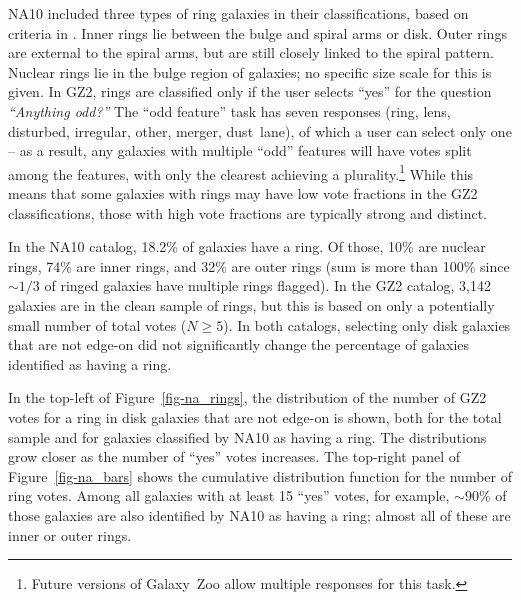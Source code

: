 \documentclass[useAMS,usenatbib]{mn2e}
\begin{document}
NA10 included three types of ring galaxies in their classifications, based on criteria in \citet{but96}. Inner rings lie between the bulge and spiral arms or disk. Outer rings are external to the spiral arms, but are still closely linked to the spiral pattern. Nuclear rings lie in the bulge region of galaxies; no specific size scale for this is given. In GZ2, rings are classified only if the user selects ``yes'' for the question {\it ``Anything odd?''} The ``odd feature'' task has seven responses (ring, lens, disturbed, irregular, other, merger, dust~lane), of which a user can select only one -- as a result, any galaxies with multiple ``odd'' features will have votes split among the features, with only the clearest achieving a plurality.\footnote{Future versions of Galaxy~Zoo allow multiple responses for this task.} While this means that some galaxies with rings may have low vote fractions in the GZ2 classifications, those with high vote fractions are typically strong and distinct.

In the NA10 catalog, 18.2\% of galaxies have a ring. Of those, 10\% are nuclear rings, 74\% are inner rings, and 32\% are outer rings (sum is more than 100\% since $\sim1/3$ of ringed galaxies have multiple rings flagged). In the GZ2 catalog, 3,142 galaxies are in the clean sample of rings, but this is based on only a potentially small number of total votes ($N\geq5$). In both catalogs, selecting only disk galaxies that are not edge-on did not significantly change the percentage of galaxies identified as having a ring. 

In the top-left of Figure~\ref{fig-na_rings}, the distribution of the number of GZ2 votes for a ring in disk galaxies that are not edge-on is shown, both for the total sample and for galaxies classified by NA10 as having a ring. The distributions grow closer as the number of ``yes'' votes increases. The top-right panel of Figure~\ref{fig-na_bars} shows the cumulative distribution function for the number of ring votes. Among all galaxies with at least 15 ``yes'' votes, for example, $\sim90\%$ of those galaxies are also identified by NA10 as having a ring; almost all of these are inner or outer rings.  
\end{document}
